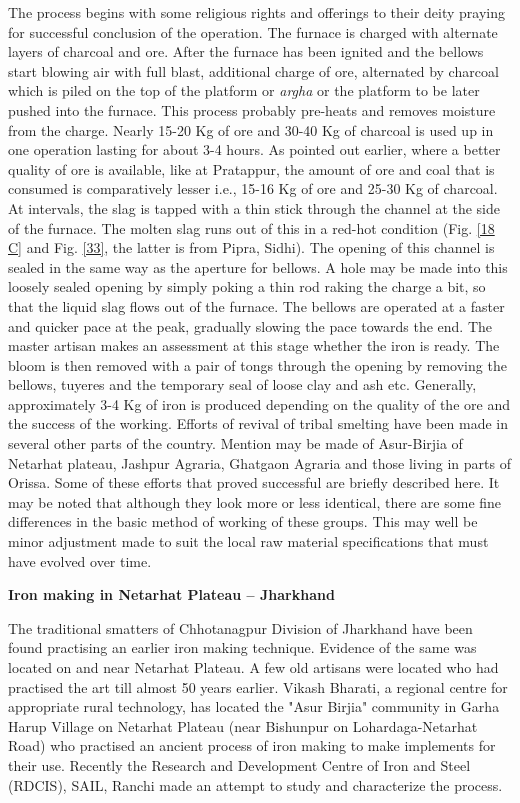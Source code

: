 The process begins with some religious rights and offerings to their deity praying for successful conclusion of the operation. The furnace is charged with alternate layers of charcoal and ore. After the furnace has been ignited and the bellows start blowing air with full blast, additional charge of ore, alternated by charcoal which is piled on the top of the platform or {\it argha} or the platform to be later pushed into the furnace. This process probably pre-heats and removes moisture from the charge. Nearly 15-20 Kg of ore and 30-40 Kg of charcoal is used up in one operation lasting for about 3-4 hours. As pointed out earlier, where a better quality of ore is available, like at Pratappur, the amount of ore and coal that is consumed is comparatively lesser i.e., 15-16 Kg of ore and 25-30 Kg of charcoal. At intervals, the slag is tapped with a thin stick through the channel at the side of the furnace. The molten slag runs out of this in a red-hot condition (Fig. \ref{18 C} and Fig. \ref{33}, the latter is from Pipra, Sidhi). The opening of this channel is sealed in the same way as the aperture for bellows. A hole may be made into this loosely sealed opening by simply poking a thin rod raking the charge a bit, so that the liquid slag flows out of the furnace. The bellows are operated at a faster and quicker pace at the peak, gradually slowing the pace towards the end. The master artisan makes an assessment at this stage whether the iron is ready. The bloom is then removed with a pair of tongs through the opening by removing the bellows, tuyeres and the temporary seal of loose clay and ash etc. Generally, approximately 3-4 Kg of iron is produced depending on the quality of the ore and the success of the working. Efforts of revival of tribal smelting have been made in several other parts of the country. Mention may be made of Asur-Birjia of Netarhat plateau, Jashpur Agraria, Ghatgaon Agraria and those living in parts of Orissa. Some of these efforts that proved successful are briefly described here. It may be noted that although they look more or less identical, there are some fine differences in the basic method of working of these groups. This may well be minor adjustment made to suit the local raw material specifications that must have evolved over time.
\medskip

\noindent \textbf{\large Iron making in Netarhat Plateau – Jharkhand}

\medskip
The traditional smatters of Chhotanagpur Division of Jharkhand have been found practising an earlier iron making technique. Evidence of the same was located on and near Netarhat Plateau. A few old artisans were located who had practised the art till almost 50 years earlier. Vikash Bharati, a regional centre for appropriate rural technology, has located the "Asur Birjia" community in Garha Harup Village on Netarhat Plateau (near Bishunpur on Lohardaga-Netarhat Road) who practised an ancient process of iron making to make implements for their use. Recently the Research and Development Centre of Iron and Steel (RDCIS), SAIL, Ranchi made an attempt to study and characterize the process.
\medskip

